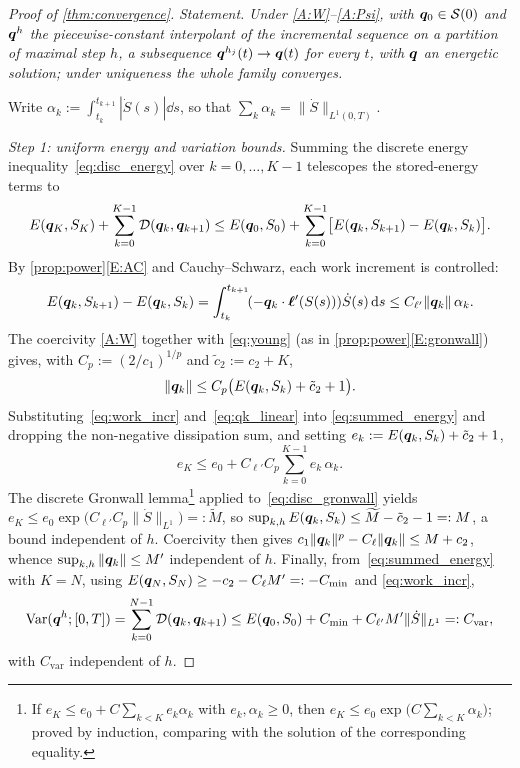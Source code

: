 \begin{proof}[Proof of \cref{thm:convergence}]
\emph{Statement.} \emph{Under \ref{A:W}--\ref{A:Psi}, with
$\bm{q}_0\in\mathcal S(0)$ and $\bm{q}^h$ the piecewise-constant
interpolant of the incremental sequence on a partition of maximal step
$h$, a subsequence $\bm{q}^{h_j}(t)\to\bm{q}(t)$ for every $t$, with
$\bm{q}$ an energetic solution; under uniqueness the whole family
converges.}

\smallskip
Write $\alpha_k:=\int_{t_k}^{t_{k+1}}|\dot S(s)|\dd s$, so that
$\sum_k\alpha_k=\|\dot S\|_{L^1(0,T)}$.

\emph{Step 1: uniform energy and variation bounds.} Summing the
discrete energy inequality~\eqref{eq:disc_energy} over $k=0,\dots,K-1$
telescopes the stored-energy terms to
\begin{equation}\label{eq:summed_energy}
  E(\bm{q}_K,S_K)+\sum_{k=0}^{K-1}\mathcal{D}(\bm{q}_k,\bm{q}_{k+1})
  \le E(\bm{q}_0,S_0)+\sum_{k=0}^{K-1}\bigl[E(\bm{q}_k,S_{k+1})-E(\bm{q}_k,S_k)\bigr].
\end{equation}
By \cref{prop:power}\ref{E:AC} and Cauchy--Schwarz, each work increment
is controlled:
\begin{equation}\label{eq:work_incr}
  E(\bm{q}_k,S_{k+1})-E(\bm{q}_k,S_k)
  =\int_{t_k}^{t_{k+1}}\!(-\bm{q}_k\cdot\bm{\ell}'(S(s)))\dot S(s)\mathop{}\!\mathrm{d} s
  \le C_{\ell'}\|\bm{q}_k\|\,\alpha_k .
\end{equation}
The coercivity \ref{A:W} together with \eqref{eq:young} (as in
\cref{prop:power}\ref{E:gronwall}) gives, with $C_p:=(2/c_1)^{1/p}$ and
$\tilde c_2:=c_2+K$,
\begin{equation}\label{eq:qk_linear}
  \|\bm{q}_k\|\le C_p\bigl(E(\bm{q}_k,S_k)+\tilde c_2+1\bigr).
\end{equation}
Substituting~\eqref{eq:work_incr} and~\eqref{eq:qk_linear} into
\eqref{eq:summed_energy} and dropping the non-negative dissipation sum,
and setting $e_k:=E(\bm{q}_k,S_k)+\tilde c_2+1$,
\begin{equation}\label{eq:disc_gronwall}
  e_K\le e_0+C_{\ell'}C_p\sum_{k=0}^{K-1}e_k\,\alpha_k .
\end{equation}
The discrete Gronwall lemma\footnote{If $e_K\le e_0+C\sum_{k<K}e_k\alpha_k$
with $e_k,\alpha_k\ge0$, then $e_K\le e_0\exp\!\bigl(C\sum_{k<K}\alpha_k\bigr)$;
proved by induction, comparing with the solution of the corresponding
equality.}
applied to~\eqref{eq:disc_gronwall} yields
$e_K\le e_0\exp\!\bigl(C_{\ell'}C_p\|\dot S\|_{L^1}\bigr)=:\widetilde M$,
so $\sup_{k,h}E(\bm{q}_k,S_k)\le\widetilde M-\tilde c_2-1=:M$, a bound
independent of $h$. Coercivity then gives
$c_1\|\bm{q}_k\|^p-C_\ell\|\bm{q}_k\|\le M+c_2$, whence
$\sup_{k,h}\|\bm{q}_k\|\le M'$ independent of $h$. Finally,
from~\eqref{eq:summed_energy} with $K=N$, using
$E(\bm{q}_N,S_N)\ge-c_2-C_\ell M'=:-C_{\min}$ and \eqref{eq:work_incr},
\begin{equation}\label{eq:var_bound}
  \mathrm{Var}(\bm{q}^h;[0,T])=\sum_{k=0}^{N-1}\mathcal{D}(\bm{q}_k,\bm{q}_{k+1})
  \le E(\bm{q}_0,S_0)+C_{\min}+C_{\ell'}M'\|\dot S\|_{L^1}=:C_{\mathrm{var}},
\end{equation}
with $C_{\mathrm{var}}$ independent of $h$.


\end{proof}

